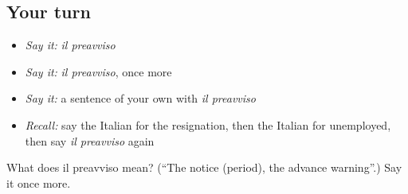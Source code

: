\subsection*{Your turn}
\begin{itemize}
\raggedright
  \item \emph{Say it:} \emph{il preavviso}
  \item \emph{Say it:} \emph{il preavviso}, once more
  \item \emph{Say it:} a sentence of your own with \emph{il preavviso}
  \item \emph{Recall:} say the Italian for the resignation, then the Italian for unemployed, then say \emph{il preavviso} again
\end{itemize}

\begin{tcolorbox}[breakable,colback=teal!4,colframe=teal!35!black,title={Before you move on}]
What does il preavviso mean? (\textquotedblleft{}The notice (period), the advance warning\textquotedblright{}.) Say it once more.
\end{tcolorbox}
